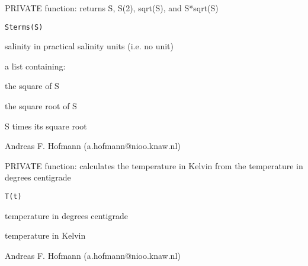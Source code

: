 \documentclass{article}
\begin{document}
\begin{Description}\relax
PRIVATE function: returns S, S(2), sqrt(S), and S*sqrt(S)
\end{Description}
\begin{Usage}
\begin{verbatim}Sterms(S)\end{verbatim}
\end{Usage}
\begin{Arguments}
\begin{ldescription}
\item[\code{S }] salinity in practical salinity units (i.e. no unit)
\end{ldescription}
\end{Arguments}
\begin{Value}
a list containing:
\begin{ldescription}
\item[\code{S\textasciicircum{}2 }] the square of S
\item[\code{sqrtS }] the square root of S
\item[\code{S*sqrtS }] S times its square root
\end{ldescription}
\end{Value}
\begin{Author}\relax
Andreas F. Hofmann (a.hofmann@nioo.knaw.nl)
\end{Author}

\begin{Description}\relax
PRIVATE function: calculates the temperature in Kelvin from the temperature in degrees centigrade
\end{Description}
\begin{Usage}
\begin{verbatim}T(t)\end{verbatim}
\end{Usage}
\begin{Arguments}
\begin{ldescription}
\item[\code{t }] temperature in degrees centigrade
\end{ldescription}
\end{Arguments}
\begin{Value}
temperature in Kelvin
\end{Value}
\begin{Author}\relax
Andreas F. Hofmann (a.hofmann@nioo.knaw.nl)
\end{Author}
\end{document}

